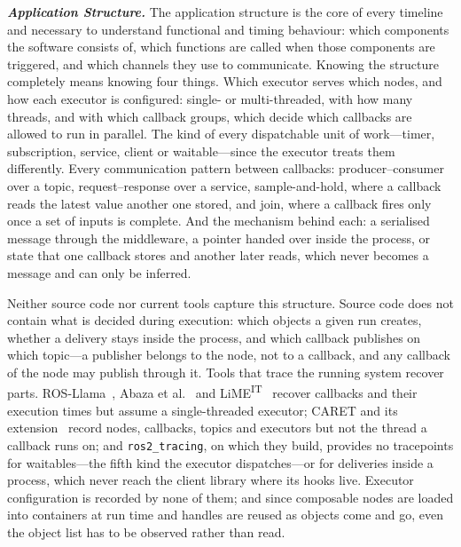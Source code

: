 \noindent
\textit{\textbf{Application Structure.}}
The application structure is the core of every timeline and necessary to understand functional and timing behaviour: which components the software consists of, which functions are called when those components are triggered, and which channels they use to communicate. Knowing the structure completely means knowing four things. Which executor serves which nodes, and how each executor is configured: single- or multi-threaded, with how many threads, and with which callback groups, which decide which callbacks are allowed to run in parallel. The kind of every dispatchable unit of work---timer, subscription, service, client or waitable---since the executor treats them differently. Every communication pattern between callbacks: producer--consumer over a topic, request--response over a service, sample-and-hold, where a callback reads the latest value another one stored, and join, where a callback fires only once a set of inputs is complete. And the mechanism behind each: a serialised message through the middleware, a pointer handed over inside the process, or state that one callback stores and another later reads, which never becomes a message and can only be inferred.

Neither source code nor current tools capture this structure. Source code does not contain what is decided during execution: which objects a given run creates, whether a delivery stays inside the process, and which callback publishes on which topic---a publisher belongs to the node, not to a callback, and any callback of the node may publish through it. Tools that trace the running system recover parts. ROS-Llama~\cite{blass-2021-rosllama-paper}, Abaza et al.~\cite{abaza-2024-ros2modelsynthesis} and LiME\textsuperscript{IT}~\cite{brandenburg-2026-limeit} recover callbacks and their execution times but assume a single-threaded executor; CARET and its extension~\cite{kuboichi-2022-caret,peng-2022-caretcomp} record nodes, callbacks, topics and executors but not the thread a callback runs on; and \texttt{ros2\_tracing}, on which they build, provides no tracepoints for waitables---the fifth kind the executor dispatches---or for deliveries inside a process, which never reach the client library where its hooks live. Executor configuration is recorded by none of them; and since composable nodes are loaded into containers at run time and handles are reused as objects come and go, even the object list has to be observed rather than read.

